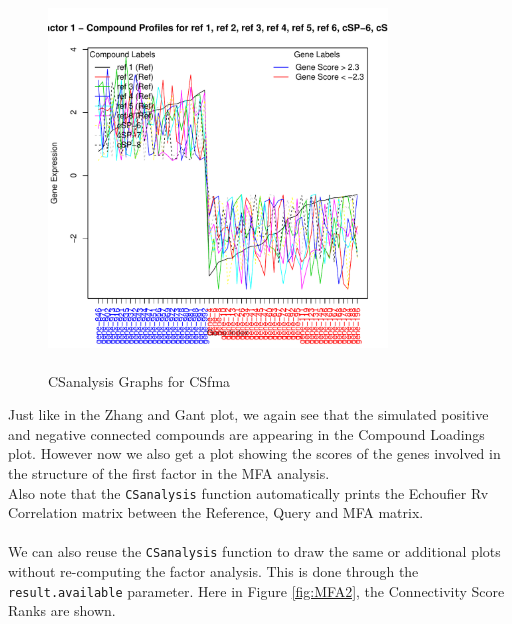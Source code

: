 \documentclass[a4paper]{article}\usepackage[]{graphicx}\usepackage[]{color}
\newenvironment{knitrout}{}{} %
\begin{document}
\begin{knitrout}
\begin{figure}[H]
\includegraphics[width=9cm,height=10cm]{figure/MFA-4} \hfill{}

\caption[CSanalysis Graphs for CSfma]{CSanalysis Graphs for CSfma\label{fig:MFA}}
\end{figure}


\end{knitrout}

\noindent Just like in the Zhang and Gant plot, we again see that the simulated
positive and negative connected compounds are appearing in the Compound Loadings
plot. However now we also get a plot showing the scores of the genes involved in
the structure of the first factor in the MFA analysis.\\
Also note that the \texttt{CSanalysis} function automatically prints the
Echoufier Rv Correlation matrix between the Reference, Query and MFA matrix.
\\ \\
We can also reuse the \texttt{CSanalysis} function to draw the same or
additional plots without re-computing the factor analysis. This is done through the
\texttt{result.available} parameter. Here in Figure \ref{fig:MFA2}, the
Connectivity Score Ranks are shown.
\end{document}
